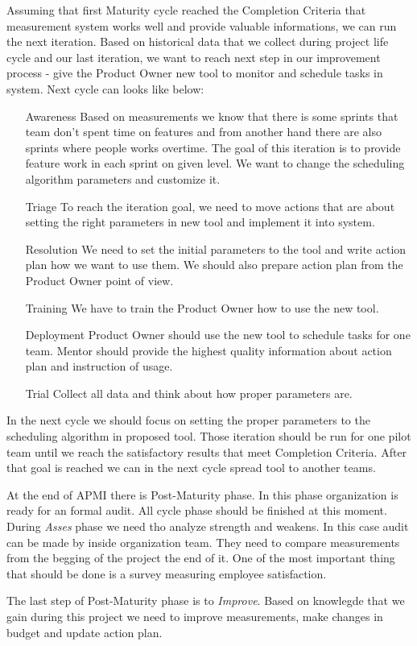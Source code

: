 Assuming that first Maturity cycle reached the Completion Criteria that measurement system works well and provide valuable informations, we can run the next iteration. Based on historical data that we collect during project life cycle and our last iteration, we want to reach next step in our improvement process - give the Product Owner new tool to monitor and schedule tasks in system. Next cycle can looks like below:

\begin{enumerate}
\item[Awareness] Based on measurements we know that there is some sprints that team don't spent time on features and from another hand there are also sprints where people works overtime. The goal of this iteration is to provide feature work in each sprint on given level. We want to change the scheduling algorithm parameters and customize it.
\item[Triage] To reach the iteration goal, we need to move actions that are about setting the right parameters in new tool and implement it into system.
\item[Resolution] We need to set the initial parameters to the tool and write action plan how we want to use them. We should also prepare action plan from the Product Owner point of view.
\item[Training] We have to train the Product Owner how to use the new tool. 
\item[Deployment] Product Owner should use the new tool to schedule tasks for one team. Mentor should provide the highest quality information about action plan and instruction of usage. 
\item[Trial] Collect all data and think about how proper parameters are.
\end{enumerate}
In the next cycle we should focus on setting the proper parameters to the scheduling algorithm in proposed tool. Those iteration should be run for one pilot team until we reach the satisfactory results that meet Completion Criteria. After that goal is reached we can in the next cycle spread tool to another teams. 

At the end of APMI there is Post-Maturity phase. In this phase organization is ready for an formal audit. All cycle phase should be finished at this moment. During \textit{Asses} phase we need tho analyze strength and weakens. In this case audit can be made by inside organization team. They need to compare measurements from the begging of the project the end of it. One of the most important thing that should be done is a survey measuring employee satisfaction.

The last step of Post-Maturity phase is to \textit{Improve}. Based on knowlegde that we gain during this project we need to improve measurements, make changes in budget and update action plan. 